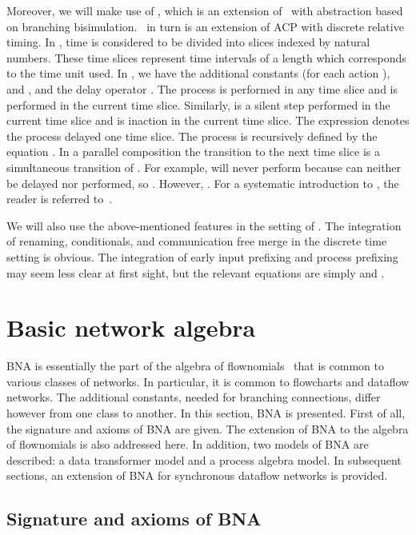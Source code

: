 \documentclass[fleqn]{llncs}
\begin{document}
Moreover, we will make use of \acpdrtt, which is an extension of 
\acpdrt\ with abstraction based on branching bisimulation.
\acpdrt\ in turn is an extension of ACP with discrete relative timing.
In \acpdrtt, time is considered to be divided into slices indexed by 
natural numbers.
These time slices represent time intervals of a length which corresponds
to the time unit used.
In \acpdrtt, we have the additional constants  (for each action 
),  and , and the delay operator .
The process  is  performed in any time slice and 
is  performed in the current time slice.
Similarly,  is a silent step performed in the current time
slice and  is inaction in the current time slice.
The expression  denotes the process  delayed one time 
slice.
The process  is recursively defined by the equation
.
In a parallel composition  the
transition to the next time slice is a simultaneous transition of 
.
For example,  will never perform
 because  can neither be delayed nor performed, so
.
However, .
For a systematic introduction to \acpdrtt, the reader is referred
to~\cite{BM02a}.

We will also use the above-mentioned features in the setting of \acpdrtt.
The integration of renaming, conditionals, and communication free merge 
in the discrete time setting is obvious.
The integration of early input prefixing and process prefixing may seem 
less clear at first sight, but the relevant equations are simply
 and
.

\section{Basic network algebra}
\label{bna}
BNA is essentially the part of the algebra of flownomials~\cite{CS90}
that is common to various classes of networks.
In particular, it is common to flowcharts and dataflow networks.
The additional constants, needed for branching connections, differ
however from one class to another.
In this section, BNA is presented.
First of all, the signature and axioms of BNA are given.
The extension of BNA to the algebra of flownomials is also addressed
here.
In addition, two models of BNA are described: a data transformer model
and a process algebra model.
In subsequent sections, an extension of BNA for synchronous dataflow 
networks is provided.

\subsection{Signature and axioms of BNA}
\label{bna-sig-axioms}
\end{document}
